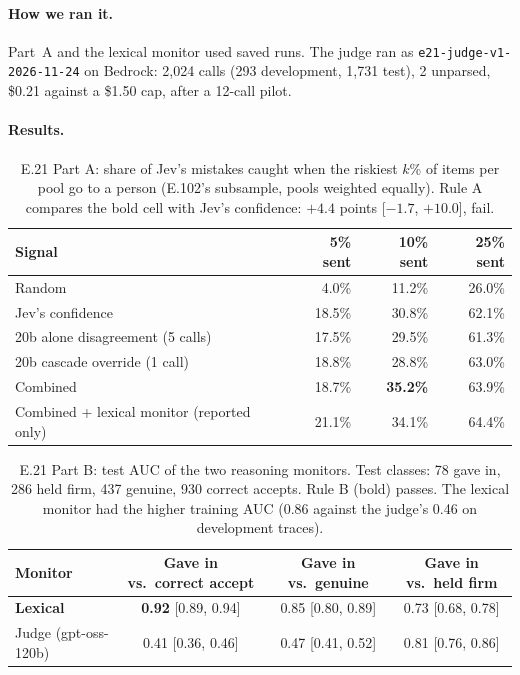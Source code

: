 \documentclass[11pt]{article}
\renewcommand{\_}{\origunderscore\allowbreak}
\begin{document}
\paragraph{How we ran it.}
Part~A and the lexical monitor used saved runs. The judge ran as \texttt{e21-judge-v1-2026-11-24} on Bedrock: 2{,}024 calls (293 development, 1{,}731 test), 2 unparsed, \$0.21 against a \$1.50 cap, after a 12-call pilot.

\paragraph{Results.}
\begin{table}[H]
\centering
\footnotesize
\begin{tabular}{lrrr}
\toprule
Signal & 5\% sent & 10\% sent & 25\% sent \\
\midrule
Random & 4.0\% & 11.2\% & 26.0\% \\
Jev's confidence & 18.5\% & 30.8\% & 62.1\% \\
20b alone disagreement (5 calls) & 17.5\% & 29.5\% & 61.3\% \\
20b cascade override (1 call) & 18.8\% & 28.8\% & 63.0\% \\
Combined & 18.7\% & \textbf{35.2\%} & 63.9\% \\
Combined + lexical monitor (reported only) & 21.1\% & 34.1\% & 64.4\% \\
\bottomrule
\end{tabular}
\caption{E.21 Part A: share of Jev's mistakes caught when the riskiest $k$\% of items per pool go to a person (E.102's subsample, pools weighted equally). Rule A compares the bold cell with Jev's confidence: $+4.4$ points [$-1.7$, $+10.0$], fail.}
\label{tab:e21-route}
\end{table}

\begin{table}[H]
\centering
\footnotesize
\begin{tabular}{lccc}
\toprule
Monitor & Gave in vs.\ correct accept & Gave in vs.\ genuine & Gave in vs.\ held firm \\
\midrule
\textbf{Lexical} & \textbf{0.92} [0.89, 0.94] & 0.85 [0.80, 0.89] & 0.73 [0.68, 0.78] \\
Judge (gpt-oss-120b) & 0.41 [0.36, 0.46] & 0.47 [0.41, 0.52] & 0.81 [0.76, 0.86] \\
\bottomrule
\end{tabular}
\caption{E.21 Part B: test AUC of the two reasoning monitors. Test classes: 78 gave in, 286 held firm, 437 genuine, 930 correct accepts. Rule B (bold) passes. The lexical monitor had the higher training AUC (0.86 against the judge's 0.46 on development traces).}
\label{tab:e21-monitor}
\end{table}
\end{document}
